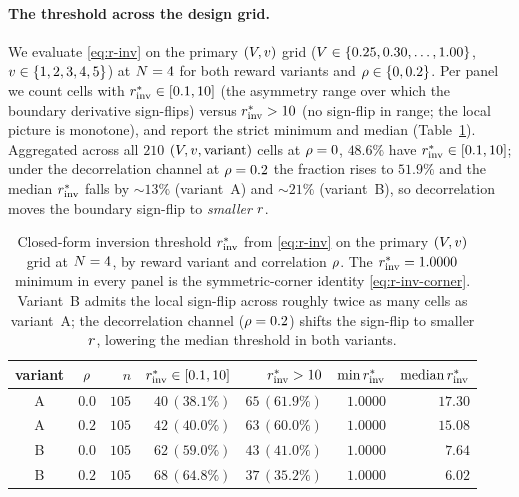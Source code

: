 \paragraph{The threshold across the design grid.}
We evaluate \eqref{eq:r-inv} on the primary $(V, v)$ grid
($V \in \{0.25, 0.30, \ldots, 1.00\}$, $v \in \{1, 2, 3, 4,
5\}$) at $N = 4$ for both reward variants and $\rho \in \{0,
0.2\}$. Per panel we count cells with $r^{*}_{\mathrm{inv}} \in [0.1, 10]$ (the
asymmetry range over which the boundary derivative sign-flips) versus
$r^{*}_{\mathrm{inv}} > 10$ (no sign-flip in range; the local picture is
monotone), and report the strict minimum and median
(Table~\ref{tab:noninv-tally}). Aggregated across all $210$ $(V,
v, \text{variant})$ cells at $\rho = 0$, $48.6\%$ have $r^{*}_{\mathrm{inv}}
\in [0.1, 10]$; under the decorrelation channel at $\rho = 0.2$ the
fraction rises to $51.9\%$ and the median $r^{*}_{\mathrm{inv}}$ falls by $\sim
13\%$ (variant~A) and $\sim 21\%$ (variant~B), so decorrelation moves
the boundary sign-flip to \emph{smaller} $r$.
%
\begin{table}[t]
  \centering
  \small
  \begin{tabular}{c c r r r r r}
    \toprule
    variant & $\rho$ & $n$ & $r^{*}_{\mathrm{inv}} \in [0.1, 10]$ &
    $r^{*}_{\mathrm{inv}} > 10$ & $\min r^{*}_{\mathrm{inv}}$ & $\mathrm{median}\,r^{*}_{\mathrm{inv}}$ \\
    \midrule
    A & $0.0$ & $105$ & $40\,(38.1\%)$ & $65\,(61.9\%)$ &
              $1.0000$ & $17.30$ \\
    A & $0.2$ & $105$ & $42\,(40.0\%)$ & $63\,(60.0\%)$ &
              $1.0000$ & $15.08$ \\
    B & $0.0$ & $105$ & $62\,(59.0\%)$ & $43\,(41.0\%)$ &
              $1.0000$ & $\phantom{0}7.64$ \\
    B & $0.2$ & $105$ & $68\,(64.8\%)$ & $37\,(35.2\%)$ &
              $1.0000$ & $\phantom{0}6.02$ \\
    \bottomrule
  \end{tabular}
  \caption{Closed-form inversion threshold $r^{*}_{\mathrm{inv}}$ from
  \eqref{eq:r-inv} on the primary $(V, v)$ grid at $N = 4$,
  by reward variant and correlation $\rho$. The $r^{*}_{\mathrm{inv}} =
  1.0000$ minimum in every panel is the symmetric-corner identity
  \eqref{eq:r-inv-corner}. Variant~B admits the local sign-flip across
  roughly twice as many cells as variant~A; the decorrelation channel
  ($\rho = 0.2$) shifts the sign-flip to smaller $r$, lowering the
  median threshold in both variants.}
  \label{tab:noninv-tally}
\end{table}
